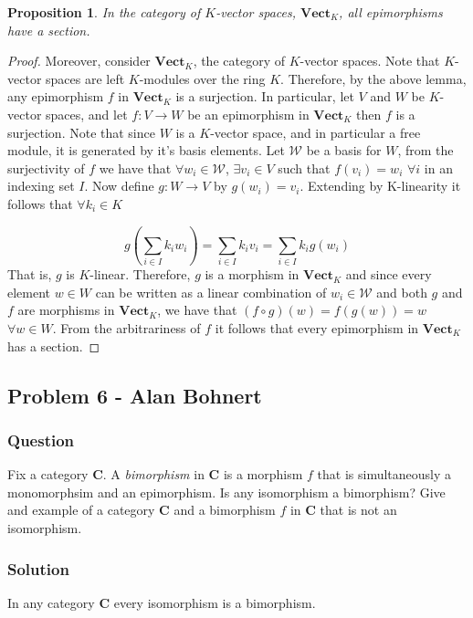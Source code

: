 \documentclass{article}
\newtheorem{proposition}[subsection]{Proposition}
\begin{document}
\begin{proposition}
In the category of $K$-vector spaces, $\mathbf{Vect}_{K}$, all epimorphisms have a section.
\end{proposition}

\begin{proof}
Moreover, consider $\mathbf{Vect}_{K}$, the category of $K$-vector spaces. Note that $K$-vector spaces are left $K$-modules over the ring $K$. Therefore, by the above lemma, any epimorphism $f$ in $\mathbf{Vect}_{K}$ is a surjection. In particular, let $V$ and $W$ be $K$-vector spaces, and let $f:V\to W$ be an epimorphism in $\mathbf{Vect}_{K}$ then $f$ is a surjection. Note that since $W$ is a $K$-vector space, and in particular a free module, it is generated by it's basis elements. Let $\mathcal{W}$ be a basis for $W$, from the surjectivity of $f$ we have that $\forall w_{i}\in \mathcal{W}$, $\exists v_{i}\in V$ such that $f(v_{i})=w_{i}$ $\forall i$ in an indexing set $\textit{I}$. Now define $g:W\to V$ by $g(w_{i})=v_{i}$. Extending by K-linearity it follows that $\forall k_{i}\in K$

\[g(\sum\limits_{i\in \textit{I}} k_{i}w_{i})=\sum\limits_{i\in \textit{I}} k_{i}v_{i}=\sum\limits_{i\in \textit{I}} k_{i}g(w_{i})\]
That is, $g$ is $K$-linear. Therefore, $g$ is a morphism in $\mathbf{Vect}_{K}$ and since every element $w\in W$ can be written as a linear combination of $w_{i}\in \mathcal{W}$ and both $g$ and $f$ are morphisms in $\mathbf{Vect}_{K}$, we have that $(f\circ g)(w)=f(g(w))=w$ $\forall w\in W$. From the arbitrariness of $f$ it follows that every epimorphism in $\mathbf{Vect}_{K}$ has a section. 
\end{proof}
	
	\subsection{Problem 6 - Alan Bohnert}
	\subsubsection{Question}
	Fix a category \textbf{C}. 
	A \textit{bimorphism} in \textbf{C} is a morphism $f$ that is simultaneously a monomorphsim and an epimorphism. Is any isomorphism a bimorphism? 
	Give and example of a category \textbf{C} and a bimorphism $f$ in \textbf{C} that is not an isomorphism.
	
	\subsubsection{Solution}
	In any category \textbf{C} every isomorphism is a bimorphism.
	
\end{document}

